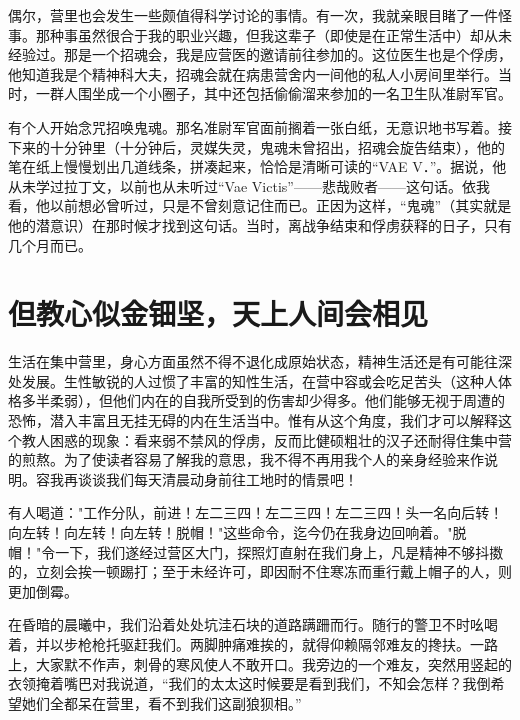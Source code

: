 \documentclass[11pt,oneside]{book}
\begin{document}
\begin{common-format}
偶尔，营里也会发生一些颇值得科学讨论的事情。有一次，我就亲眼目睹了一件怪事。那种事虽然很合于我的职业兴趣，但我这辈子（即使是在正常生活中）却从未经验过。那是一个招魂会，我是应营医的邀请前往参加的。这位医生也是个俘虏，他知道我是个精神科大夫，招魂会就在病患营舍内一间他的私人小房间里举行。当时，一群人围坐成一个小圈子，其中还包括偷偷溜来参加的一名卫生队准尉军官。

有个人开始念咒招唤鬼魂。那名准尉军官面前搁着一张白纸，无意识地书写着。接下来的十分钟里（十分钟后，灵媒失灵，鬼魂未曾招出，招魂会旋告结束），他的笔在纸上慢慢划出几道线条，拼凑起来，恰恰是清晰可读的“VAE V．”。据说，他从未学过拉丁文，以前也从未听过“Vae Victis”——悲哉败者——这句话。依我看，他以前想必曾听过，只是不曾刻意记住而已。正因为这样，“鬼魂”（其实就是他的潜意识）在那时候才找到这句话。当时，离战争结束和俘虏获释的日子，只有几个月而已。


\section[但教心似金钿坚，天上人间会相见]{但教心似金钿坚，天上人间会相见}
生活在集中营里，身心方面虽然不得不退化成原始状态，精神生活还是有可能往深处发展。生性敏锐的人过惯了丰富的知性生活，在营中容或会吃足苦头（这种人体格多半柔弱），但他们内在的自我所受到的伤害却少得多。他们能够无视于周遭的恐怖，潜入丰富且无挂无碍的内在生活当中。惟有从这个角度，我们才可以解释这个教人困惑的现象：看来弱不禁风的俘虏，反而比健硕粗壮的汉子还耐得住集中营的煎熬。为了使读者容易了解我的意思，我不得不再用我个人的亲身经验来作说明。容我再谈谈我们每天清晨动身前往工地时的情景吧！

有人喝道："工作分队，前进！左二三四！左二三四！左二三四！头一名向后转！向左转！向左转！向左转！脱帽！"这些命令，迄今仍在我身边回响着。"脱帽！"令一下，我们遂经过营区大门，探照灯直射在我们身上，凡是精神不够抖擞的，立刻会挨一顿踢打；至于未经许可，即因耐不住寒冻而重行戴上帽子的人，则更加倒霉。

在昏暗的晨曦中，我们沿着处处坑洼石块的道路蹒跚而行。随行的警卫不时吆喝着，并以步枪枪托驱赶我们。两脚肿痛难挨的，就得仰赖隔邻难友的搀扶。一路上，大家默不作声，刺骨的寒风使人不敢开口。我旁边的一个难友，突然用竖起的衣领掩着嘴巴对我说道，“我们的太太这时候要是看到我们，不知会怎样？我倒希望她们全都呆在营里，看不到我们这副狼狈相。”


\end{common-format}
\end{document}
